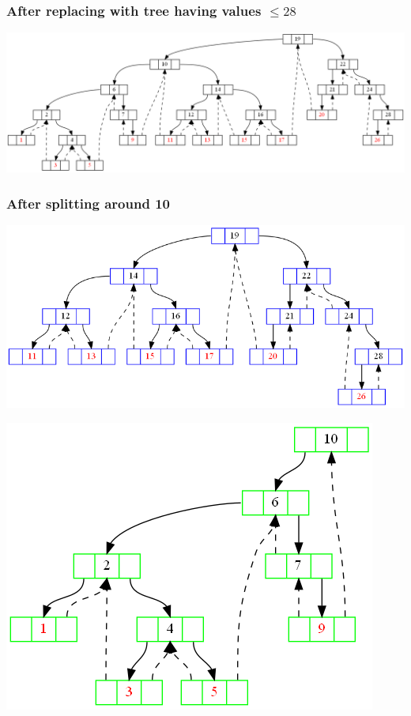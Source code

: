 \documentclass{article}
\begin{document}
\subsubsection{After replacing with tree having values $\le 28$}
\begin{center}
\includegraphics[scale=0.3]{struct7.png}
\end{center}
\subsubsection{After splitting around 10}
\begin{center}
\includegraphics[scale=0.3]{struct8.png}
\end{center}
\begin{center}
\includegraphics[scale=0.3]{struct9.png}
\end{center}
\end{document}
